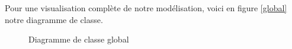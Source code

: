 \documentclass[a4paper]{article}
\begin{document}
Pour une visualisation complète de notre modélisation, voici en figure \ref{global} notre diagramme de classe.

\newpage

\thispagestyle{plain}
\begin{figure}[!h] 
  \begin{center}
    \caption{Diagramme de classe global} 
    \label{global2} 
  \end{center}
\end{figure}
\end{document}
